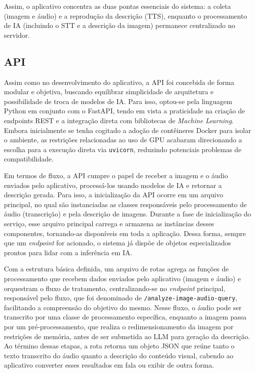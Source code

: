 Assim, o aplicativo concentra as duas pontas essenciais do sistema: a coleta (imagem e áudio) e a reprodução da descrição (TTS), enquanto o processamento de IA (incluindo o STT e a descrição da imagem) permanece centralizado no servidor.

\subsection{API}

Assim como no desenvolvimento do aplicativo, a API foi concebida de forma modular e objetiva, buscando equilibrar simplicidade de arquitetura e possibilidade de troca de modelos de IA. Para isso, optou-se pela linguagem Python em conjunto com o FastAPI, tendo em vista a praticidade na criação de endpoints REST e a integração direta com bibliotecas de \textit{Machine Learning}. Embora inicialmente se tenha cogitado a adoção de contêineres Docker para isolar o ambiente, as restrições relacionadas ao uso de GPU acabaram direcionando a escolha para a execução direta via \lstinline{uvicorn}, reduzindo potenciais problemas de compatibilidade.

Em termos de fluxo, a API cumpre o papel de receber a imagem e o áudio enviados pelo aplicativo, processá-los usando modelos de IA e retornar a descrição gerada. Para isso, a inicialização da API ocorre em um arquivo principal, no qual são instanciadas as classes responsáveis pelo processamento de áudio (transcrição) e pela descrição de imagens. Durante a fase de inicialização do serviço, esse arquivo principal carrega e armazena as instâncias desses componentes, tornando-as disponíveis em toda a aplicação. Dessa forma, sempre que um \textit{endpoint} for acionado, o sistema já dispõe de objetos especializados prontos para lidar com a inferência em IA.

Com a estrutura básica definida, um arquivo de rotas agrega as funções de processamento que recebem dados enviados pelo aplicativo (imagem e áudio) e orquestram o fluxo de tratamento, centralizando-se no \textit{endpoint} principal, responsável pelo fluxo, que foi denominado de \lstinline{/analyze-image-audio-query}, facilitando a compreensão do objetivo do mesmo. Nesse fluxo, o áudio pode ser transcrito por uma classe de processamento específica, enquanto a imagem passa por um pré-processamento, que realiza o redimensionamento da imagem por restrições de memória, antes de ser submetida ao LLM para geração da descrição. Ao término dessas etapas, a rota retorna um objeto JSON que reúne tanto o texto transcrito do áudio quanto a descrição do conteúdo visual, cabendo ao aplicativo converter esses resultados em fala ou exibir de outra forma.

